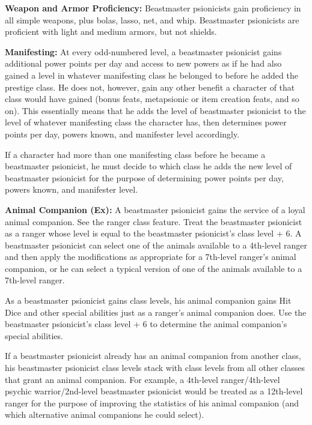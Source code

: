 {
\textbf{Weapon and Armor Proficiency:} Beastmaster psionicists gain proficiency in all simple weapons, plus bolas, lasso, net, and whip. Beastmaster psionicists are proficient with light and medium armors, but not shields.

\textbf{Manifesting:} At every odd-numbered level, a beastmaster psionicist gains additional power points per day and access to new powers as if he had also gained a level in whatever manifesting class he belonged to before he added the prestige class. He does not, however, gain any other benefit a character of that class would have gained (bonus feats, metapsionic or item creation feats, and so on). This essentially means that he adds the level of beastmaster psionicist to the level of whatever manifesting class the character has, then determines power points per day, powers known, and manifester level accordingly.

If a character had more than one manifesting class before he became a beastmaster psionicist, he must decide to which class he adds the new level of beastmaster psionicist for the purpose of determining power points per day, powers known, and manifester level.

\textbf{Animal Companion (Ex):} A beastmaster psionicist gains the service of a loyal animal companion. See the ranger class feature. Treat the beastmaster psionicist as a ranger whose level is equal to the beastmaster psionicist's class level + 6. A beastmaster psionicist can select one of the animals available to a 4th-level ranger and then apply the modifications as appropriate for a 7th-level ranger's animal companion, or he can select a typical version of one of the animals available to a 7th-level ranger.

As a beastmaster psionicist gains class levels, his animal companion gains Hit Dice and other special abilities just as a ranger's animal companion does. Use the beastmaster psionicist's class level + 6 to determine the animal companion's special abilities.

If a beastmaster psionicist already has an animal companion from another class, his beastmaster psionicist class levels stack with class levels from all other classes that grant an animal companion. For example, a 4th-level ranger/4th-level psychic warrior/2nd-level beastmaster psionicist would be treated as a 12th-level ranger for the purpose of improving the statistics of his animal companion (and which alternative animal companions he could select).

}
